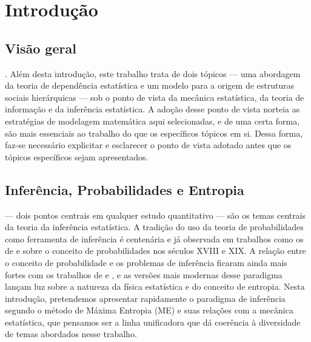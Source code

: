 \chapter{Introdução}
\setlength{\epigraphwidth}{0.7\textwidth}


\begin{epigraphs}
\end{epigraphs}

\section{Visão geral}
. Além desta introdução, este trabalho trata de dois tópicos --- uma abordagem da teoria de dependência estatística e um modelo para a origem de estruturas sociais hierárquicas --- sob o ponto de vista da mecânica estatística, da teoria de informação e da inferência estatística. A adoção desse ponto de vista norteia as estratégias de modelagem matemática aqui selecionadas, e de uma certa forma, são mais essenciais ao trabalho do que os específicos tópicos em si. Dessa forma, faz-se necessário explicitar e esclarecer o ponto de vista adotado antes que os tópicos específicos sejam apresentados. 

\section{Inferência, Probabilidades e Entropia}
\label{sec:inferencia}

 --- dois pontos centrais em qualquer estudo quantitativo --- são os temas centrais da teoria da inferência estatística. A tradição do uso da teoria de probabilidades como ferramenta de inferência é centenária e já observada em trabalhos como os de \citet{moivre1718} e \citet{laplace1814, laplace1840} sobre o conceito de probabilidades nos séculos XVIII e XIX. A relação entre o conceito de probabilidade e os problemas de inferência ficaram ainda mais fortes com os trabalhos de \citet{Cox1946}\cite[-9cm]{Cox1946,Cox1961} e \citet{Shannon1948}\cite[-6cm]{Shannon1948}, e as versões mais modernas desse paradigma\cite[-5cm]{Jaynes2003,ACaticha2008,ACaticha2009} lançam luz sobre a natureza da física estatística e do conceito de entropia. Nesta introdução, pretendemos apresentar rapidamente o paradigma de inferência segundo o método de Máxima Entropia (ME) e suas relações com a mecânica estatística, que pensamos ser a linha unificadora que dá coerência à diversidade de temas abordados nesse trabalho. 

